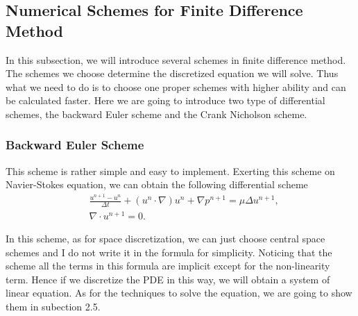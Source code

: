 \documentclass[english, nochinese]{pkupaper}
\begin{document}
\subsection{Numerical Schemes for Finite Difference Method}\label{schemes}
\par In this subsection, we will introduce several schemes in finite difference method. The schemes we choose determine the discretized equation we will solve. Thus what we need to do is to choose one proper schemes with higher ability and can be calculated faster. Here we are going to introduce two type of differential schemes, the backward Euler scheme and the Crank Nicholson scheme.
\subsubsection{Backward Euler Scheme}
\par This scheme is rather simple and easy to implement. Exerting this scheme on Navier-Stokes equation, we can obtain the following differential scheme
\begin{equation}
	\begin{aligned}
		&\frac{u^{n+1} - u^n}{\Delta t} + (u^n\cdot\nabla)u^n + \nabla p^{n+1} = \mu\Delta u^{n+1},\\
		&\nabla\cdot u^{n+1} = 0.
	\end{aligned}
\end{equation}
\par In this scheme, as for space discretization, we can just choose central space schemes and I do not write it in the formula for simplicity. Noticing that the scheme all the terms in this formula are implicit except for the non-linearity term. Hence if we discretize the PDE in this way, we will obtain a system of linear equation. As for the techniques to solve the equation, we are going to show them in subection 2.5.
\end{document}
